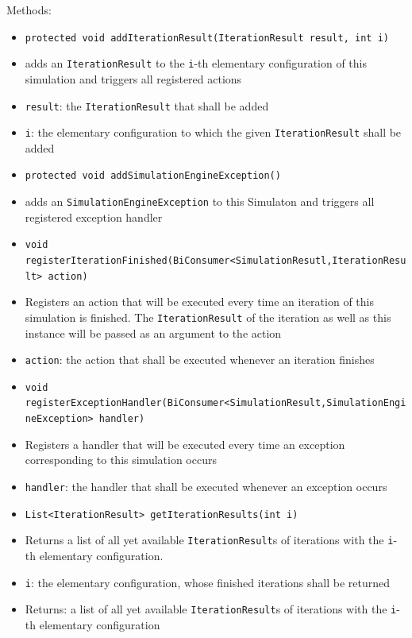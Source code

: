 \documentclass[parskip=full,11pt]{scrartcl}
\begin{document}
Methods:
\begin{itemize}\itemsep -10pt
	\item \texttt{protected void addIterationResult(IterationResult result, int i)}
	\item[] adds an \texttt{IterationResult} to the \texttt{i}-th elementary configuration of this simulation and triggers all registered actions
	\item[] \texttt{result}: the \texttt{IterationResult} that shall be added
	\item[] \texttt{i}: the elementary configuration to which the given \texttt{IterationResult} shall be added
	
	\item \texttt{protected void addSimulationEngineException()}
	\item[] adds an \texttt{SimulationEngineException} to this Simulaton and triggers all registered exception handler
	
	\item \texttt{void registerIterationFinished(BiConsumer<SimulationResutl,IterationResult> action)}
	\item[] Registers an action that will be executed every time an iteration of this simulation is finished. The \texttt{IterationResult} of the iteration as well as this instance will be passed as an argument to the action
	\item[] \texttt{action}: the action that shall be executed whenever an iteration finishes
	
	\item \texttt{void registerExceptionHandler(BiConsumer<SimulationResult,SimulationEngineException> handler)}
	\item[] Registers a handler that will be executed every time an exception corresponding to this simulation occurs
	\item[] \texttt{handler}: the handler that shall be executed whenever an exception occurs
	
	\item \texttt{List<IterationResult> getIterationResults(int i)}
	\item[] Returns a list of all yet available \texttt{IterationResult}s of iterations with the \texttt{i}-th elementary configuration.
	\item[] \texttt{i}: the elementary configuration, whose finished iterations shall be returned
	\item[] Returns: a list of all yet available \texttt{IterationResult}s of iterations with the \texttt{i}-th elementary configuration
	

\end{itemize}
\end{document}
